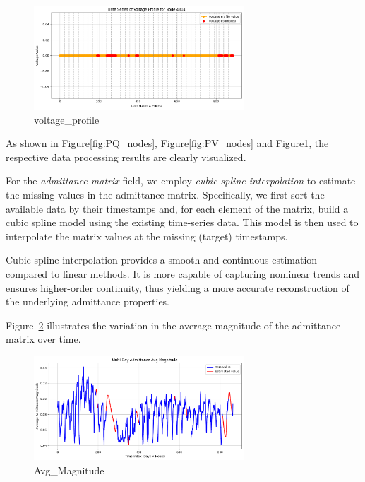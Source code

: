 \documentclass[12pt]{article}
\begin{document}
\begin{figure}[H]
    \centering
    \includegraphics[width=0.7\textwidth]{picture/voltage_profile.png}
    \caption{voltage\_profile}
\label{fig:voltage_profile}
\end{figure}

As shown in Figure\ref{fig:PQ_nodes}, Figure\ref{fig:PV_nodes} and Figure\ref{fig:voltage_profile}, the respective data processing results are clearly visualized.

For the \emph{admittance matrix} field, we employ \emph{cubic spline interpolation} to estimate the missing values in the admittance matrix. Specifically, we first sort the available data by their timestamps and, for each element of the matrix, build a cubic spline model using the existing time-series data. This model is then used to interpolate the matrix values at the missing (target) timestamps.

Cubic spline interpolation provides a smooth and continuous estimation compared to linear methods. It is more capable of capturing nonlinear trends and ensures higher-order continuity, thus yielding a more accurate reconstruction of the underlying admittance properties.

Figure~\ref{fig:Avg_Magnitude} illustrates the variation in the average magnitude of the admittance matrix over time. 

\begin{figure}[H]
    \centering
    \includegraphics[width=0.7\textwidth]{picture/Avg_Magnitude.png}
    \caption{Avg\_Magnitude}
\label{fig:Avg_Magnitude}
\end{figure}
\end{document}
